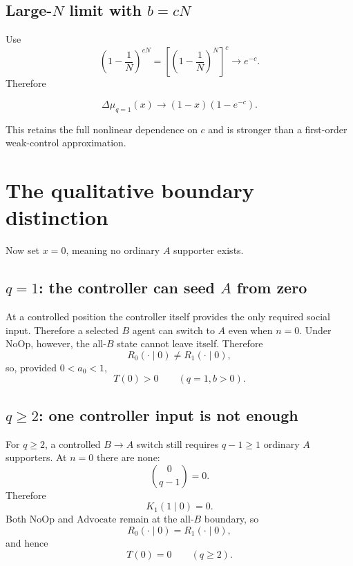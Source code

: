 \documentclass[11pt,a4paper]{article}
\newcommand{\Adv}{\ensuremath{\mathrm{Advocate}}}
\newcommand{\NoOp}{\ensuremath{\mathrm{NoOp}}}
\newcommand{\1}{\mathbbm{1}}
\begin{document}
\subsection{Large-$N$ limit with $b=cN$}

Use
\[
\left(1-\frac1N\right)^{cN}
=\left[\left(1-\frac1N\right)^N\right]^c
\longrightarrow e^{-c}.
\]
Therefore
\begin{resultbox}
\begin{equation}
\boxed{
\Delta\mu_{q=1}(x)
\longrightarrow
(1-x)(1-e^{-c}).}
\label{eq:q1limit}
\end{equation}
\end{resultbox}
This retains the full nonlinear dependence on $c$ and is stronger than a first-order weak-control approximation.

\section{The qualitative boundary distinction}

Now set $x=0$, meaning no ordinary $A$ supporter exists.

\subsection{$q=1$: the controller can seed $A$ from zero}

At a controlled position the controller itself provides the only required social input. Therefore a selected $B$ agent can switch to $A$ even when $n=0$. Under $\NoOp$, however, the all-$B$ state cannot leave itself. Therefore
\[
R_0(\cdot\mid0)\neq R_1(\cdot\mid0),
\]
so, provided $0<a_0<1$,
\begin{equation}
\boxed{T(0)>0\qquad(q=1,b>0).}
\end{equation}

\subsection{$q\ge2$: one controller input is not enough}

For $q\ge2$, a controlled $B\to A$ switch still requires $q-1\ge1$ ordinary $A$ supporters. At $n=0$ there are none:
\[
\binom{0}{q-1}=0.
\]
Therefore
\[
K_1(1\mid0)=0.
\]
Both \NoOp{} and \Adv{} remain at the all-$B$ boundary, so
\[
R_0(\cdot\mid0)=R_1(\cdot\mid0),
\]
and hence
\begin{equation}
\boxed{T(0)=0\qquad(q\ge2).}
\end{equation}
\end{document}

